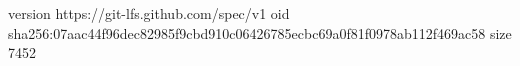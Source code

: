 version https://git-lfs.github.com/spec/v1
oid sha256:07aac44f96dec82985f9cbd910c06426785ecbc69a0f81f0978ab112f469ac58
size 7452
